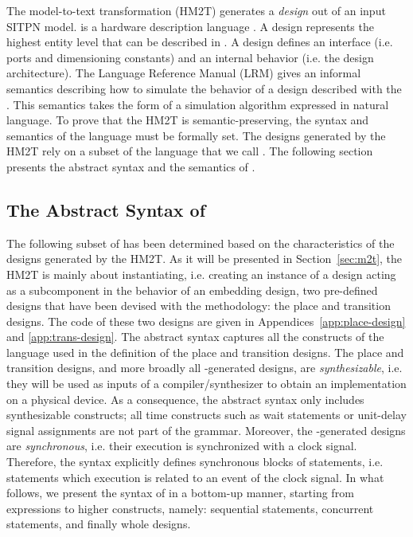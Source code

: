 \documentclass[pdflatex,sn-mathphys]{sn-jnl}%
\theoremstyle{thmstyleone}%
\theoremstyle{thmstyletwo}%
\theoremstyle{thmstylethree}%
\begin{document}
The \hilecop{} model-to-text transformation (HM2T) generates a \vhdl{}
\emph{design} out of an input SITPN model.  \vhdl{} is a hardware
description language \cite{VHDL2000}. A design represents the highest
entity level that can be described in \vhdl{}. A design defines an
interface (i.e. ports and dimensioning constants) and an internal
behavior (i.e. the design architecture). The \vhdl{} Language
Reference Manual (LRM) \cite{VHDL2000} gives an informal semantics
describing how to simulate the behavior of a design described with the
\vhdl{}. This semantics takes the form of a simulation algorithm
expressed in natural language. To prove that the HM2T is
semantic-preserving, the syntax and semantics of the \vhdl{} language
must be formally set. The designs generated by the HM2T rely on a
subset of the \vhdl{} language that we call \hvhdl{}. The following
section presents the abstract syntax and the semantics of \hvhdl{}.

\subsection{The Abstract Syntax of \hvhdl{}}
\label{subsec:abs-syntax}

The following subset of \vhdl{} has been determined based on the
characteristics of the designs generated by the HM2T. As it will be
presented in Section~\ref{sec:m2t}, the HM2T is mainly about
instantiating, i.e. creating an instance of a design acting as a
subcomponent in the behavior of an embedding design, two pre-defined
designs that have been devised with the methodology: the place and
transition designs. The \hvhdl{} code of these two designs are given
in Appendices~\ref{app:place-design} and \ref{app:trans-design}. The
\hvhdl{} abstract syntax captures all the constructs of the \vhdl{}
language used in the definition of the place and transition
designs. The place and transition designs, and more broadly all
\hilecop{}-generated designs, are \textit{synthesizable}, i.e. they
will be used as inputs of a compiler/synthesizer to obtain an
implementation on a physical device. As a consequence, the \hvhdl{}
abstract syntax only includes synthesizable constructs; all time
constructs such as wait statements or unit-delay signal assignments
are not part of the grammar. Moreover, the \hilecop{}-generated
designs are \textit{synchronous}, i.e. their execution is synchronized
with a clock signal. Therefore, the \hvhdl{} syntax explicitly defines
synchronous blocks of statements, i.e. statements which execution is
related to an event of the clock signal.  In what follows, we present
the syntax of \hvhdl{} in a bottom-up manner, starting from
expressions to higher constructs, namely: sequential statements,
concurrent statements, and finally whole designs.
\end{document}
